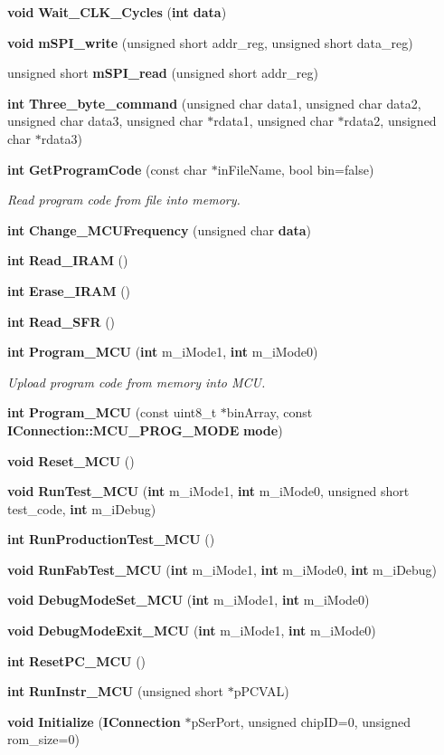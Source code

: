 \begin{DoxyCompactItemize}
{\bf void} {\bf Wait\+\_\+\+C\+L\+K\+\_\+\+Cycles} ({\bf int} {\bf data})
\item 
{\bf void} {\bf m\+S\+P\+I\+\_\+write} (unsigned short addr\+\_\+reg, unsigned short data\+\_\+reg)
\item 
unsigned short {\bf m\+S\+P\+I\+\_\+read} (unsigned short addr\+\_\+reg)
\item 
{\bf int} {\bf Three\+\_\+byte\+\_\+command} (unsigned char data1, unsigned char data2, unsigned char data3, unsigned char $\ast$rdata1, unsigned char $\ast$rdata2, unsigned char $\ast$rdata3)
\item 
{\bf int} {\bf Get\+Program\+Code} (const char $\ast$in\+File\+Name, bool bin=false)
\begin{DoxyCompactList}\small\item\em Read program code from file into memory. \end{DoxyCompactList}\item 
{\bf int} {\bf Change\+\_\+\+M\+C\+U\+Frequency} (unsigned char {\bf data})
\item 
{\bf int} {\bf Read\+\_\+\+I\+R\+AM} ()
\item 
{\bf int} {\bf Erase\+\_\+\+I\+R\+AM} ()
\item 
{\bf int} {\bf Read\+\_\+\+S\+FR} ()
\item 
{\bf int} {\bf Program\+\_\+\+M\+CU} ({\bf int} m\+\_\+i\+Mode1, {\bf int} m\+\_\+i\+Mode0)
\begin{DoxyCompactList}\small\item\em Upload program code from memory into M\+CU. \end{DoxyCompactList}\item 
{\bf int} {\bf Program\+\_\+\+M\+CU} (const uint8\+\_\+t $\ast$bin\+Array, const {\bf I\+Connection\+::\+M\+C\+U\+\_\+\+P\+R\+O\+G\+\_\+\+M\+O\+DE} {\bf mode})
\item 
{\bf void} {\bf Reset\+\_\+\+M\+CU} ()
\item 
{\bf void} {\bf Run\+Test\+\_\+\+M\+CU} ({\bf int} m\+\_\+i\+Mode1, {\bf int} m\+\_\+i\+Mode0, unsigned short test\+\_\+code, {\bf int} m\+\_\+i\+Debug)
\item 
{\bf int} {\bf Run\+Production\+Test\+\_\+\+M\+CU} ()
\item 
{\bf void} {\bf Run\+Fab\+Test\+\_\+\+M\+CU} ({\bf int} m\+\_\+i\+Mode1, {\bf int} m\+\_\+i\+Mode0, {\bf int} m\+\_\+i\+Debug)
\item 
{\bf void} {\bf Debug\+Mode\+Set\+\_\+\+M\+CU} ({\bf int} m\+\_\+i\+Mode1, {\bf int} m\+\_\+i\+Mode0)
\item 
{\bf void} {\bf Debug\+Mode\+Exit\+\_\+\+M\+CU} ({\bf int} m\+\_\+i\+Mode1, {\bf int} m\+\_\+i\+Mode0)
\item 
{\bf int} {\bf Reset\+P\+C\+\_\+\+M\+CU} ()
\item 
{\bf int} {\bf Run\+Instr\+\_\+\+M\+CU} (unsigned short $\ast$p\+P\+C\+V\+AL)
\item 
{\bf void} {\bf Initialize} ({\bf I\+Connection} $\ast$p\+Ser\+Port, unsigned chip\+ID=0, unsigned rom\+\_\+size=0)
\end{DoxyCompactItemize}

